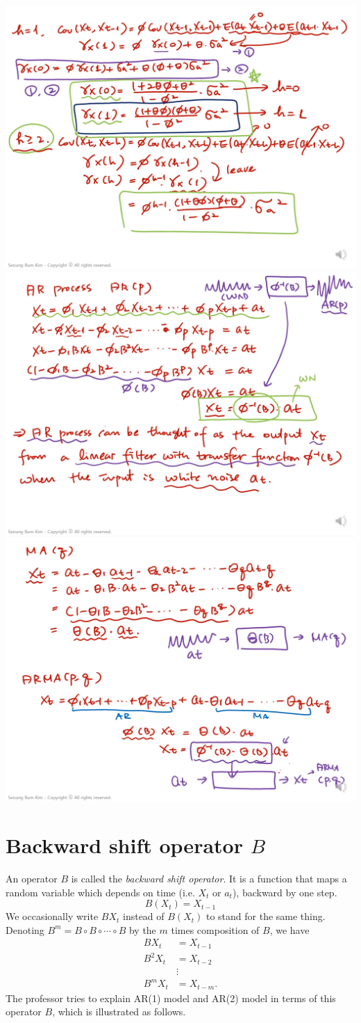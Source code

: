 \documentclass{article}
\newcommand\ar{\ensuremath{\text{AR}}}
\begin{document}
\begin{center}
\includegraphics[width=.45\textwidth]{capture5}
\includegraphics[width=.45\textwidth]{capture6}
\includegraphics[width=.45\textwidth]{capture7}
\end{center}

\section{Backward shift operator \(B\)}
An operator \(B\) is called the \emph{backward shift operator}.
It is a function that maps a random variable which depends on time (i.e. \(X_t\) or \(a_t\)), backward by one step.
\begin{equation}\label{bso}
B(X_t)=X_{t-1}
\end{equation}
We occasionally write \(B X_t\) instead of \(B(X_t)\) to stand for the same thing.
Denoting \(B^m=B\circ B\circ\cdots\circ B\) by the \(m\) times composition of \(B\), we have
\begin{align*}
B X_t &= X_{t-1}\\
B^2 X_t &= X_{t-2}\\
&\vdots\\
B^m X_t&=X_{t-m}.
\end{align*}
The professor tries to explain \ar(1) model and \ar(2) model in terms of this operator \(B\), which is illustrated as follows.
\end{document}
